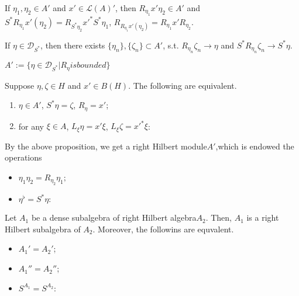 \begin{corollary}
  If $\eta_1,\eta_2 \in A'$ and $x' \in \mathcal{L}(A)'$, then $R_{\eta_1}x'\eta_2 \in A'$ and
  $S^*R_{\eta_1}x'(\eta_2)=R_{S^*\eta_2}{x'}^*S^*\eta_1$, $R_{R_{\eta_1}x'(\eta_2)}=R_{\eta_1}x'R_{\eta_2}$.
\end{corollary}

\begin{corollary}
  If $\eta \in \mathcal{D}_{S^*}$, then there exists $\{\eta_n\}, \{\zeta_n\} \subset A'$, s.t. $R_{\eta_n}\zeta_n \rightarrow \eta$ and $S^*R_{\eta_n}\zeta_n \rightarrow S^*\eta$.
\end{corollary}

\begin{definition}
  $A':=\{\eta \in \mathcal{D}_{S^*} | R_\eta is bounded \}$
\end{definition}

\begin{proposition}
  Suppose $\eta,\zeta \in H$ and $x' \in B(H)$.
  The following are equivalent.
  \begin{enumerate}
    \item $\eta \in A'$, $S^*\eta=\zeta$, $R_\eta=x'$;
    \item for any $\xi \in A$, $L_\xi\eta = x'\xi$, $L_\xi\zeta={x'}^*\xi$:
  \end{enumerate}
\end{proposition}

By the above proposition, we get a right Hilbert module$A'$,which is endowed the operations
\begin{itemize}
  \item $\eta_1\eta_2=R_{\eta_2}\eta_1;$
  \item $\eta^{\flat}=S^*\eta:$
\end{itemize}

\begin{theorem}
  Let $A_1$ be a dense subalgebra of right Hilbert algebra$A_2$.
  Then, $A_1$ is a right Hilbert subalgebra of $A_2$.
  Moreover, the followins are equvalent.
  \begin{itemize}
    \item ${A_1}'={A_2}'$;
    \item ${A_1}''={A_2}''$;
    \item $S^{A_1}=S^{A_2}$:
  \end{itemize}
\end{theorem}

